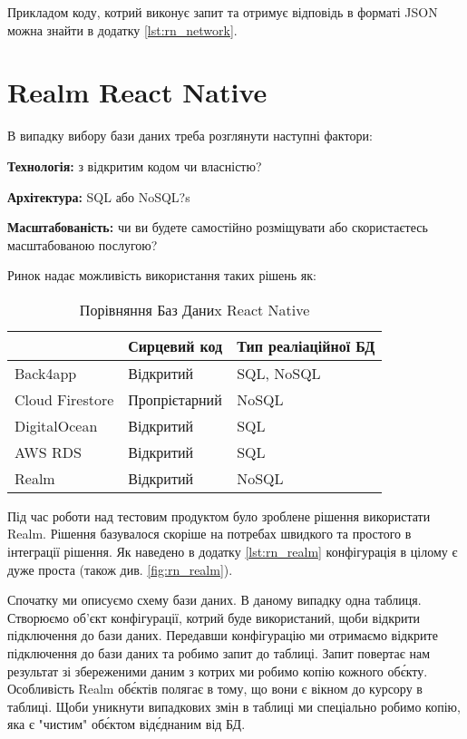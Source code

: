 Прикладом коду, котрий виконує запит та отримує відповідь в форматі JSON можна знайти в додатку \ref{lst:rn_network}.


\section{Realm React Native}
\label{section.2.6}
В випадку вибору бази даних треба розглянути наступні фактори:
\begin{itemize}
    \begin{item}
        \textbf{Технологія:} з відкритим кодом чи власністю?
    \end{item}
    \begin{item}
        \textbf{Архітектура:} SQL або NoSQL?s
    \end{item}
    \begin{item}
        \textbf{Масштабованість:} чи ви будете самостійно розміщувати або скористаєтесь масштабованою послугою?
    \end{item}
\end{itemize}

Ринок надає можливість використання таких рішень як:

\begin{longtable}[c]{|l|l|l|}
    \caption{Порівняння Баз Даниx React Native}
    \label{tab:rn_db_comparison} \\
    \hline
    & Сирцевий код  & Тип реаліаційної БД \\ \hline
    \endhead
%
    Back4app        & Відкритий     & SQL, NoSQL          \\ \hline
    Cloud Firestore & Пропрієтарний & NoSQL               \\ \hline
    DigitalOcean    & Відкритий     & SQL                 \\ \hline
    AWS RDS         & Відкритий     & SQL                 \\ \hline
    Realm           & Відкритий     & NoSQL               \\ \hline
\end{longtable}

Під час роботи над тестовим продуктом було зроблене рішення використати Realm.
Рішення базувалося скоріше на потребах швидкого та простого в інтеграції рішення.
Як наведено в додатку \ref{lst:rn_realm}  конфігурація в цілому є дуже проста (також див. \ref{fig:rn_realm}).

Спочатку ми описуємо схему бази даних. В даному випадку одна таблиця.
Створюємо об'єкт конфігурації, котрий буде використаний, щоби відкрити підключення до бази даних.
Передавши конфігурацію ми отримаємо відкрите підключення до бази даних та робимо запит до таблиці.
Запит повертає нам результат зі збереженими даним з котрих ми робимо копію кожного об\'єкту.
Особливість Realm об\'єктів полягає в тому, що вони є вікном до курсору в таблиці.
Щоби уникнути випадкових змін в таблиці ми спеціально робимо копію, яка є "чистим" об\'єктом від\'єднаним від БД.

